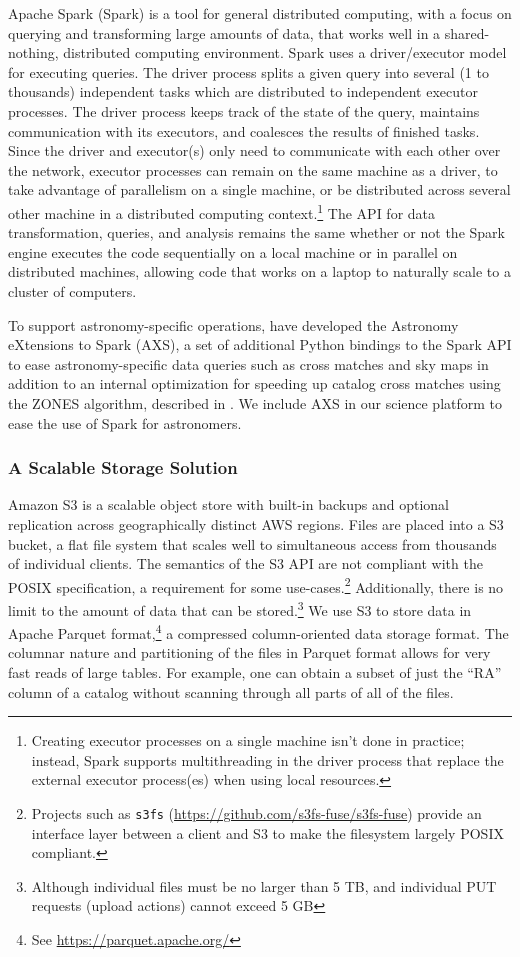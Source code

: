 \documentclass[twocolumn, linenumbers]{aastex631}
\begin{document}
Apache Spark (Spark) is a tool for general distributed computing, with a focus on querying and transforming large amounts of data, that works well in a shared-nothing, distributed computing environment. Spark uses a driver/executor model for executing queries. The driver process splits a given query into several (1 to thousands) independent tasks which are distributed to independent executor processes. The driver process keeps track of the state of the query, maintains communication with its executors, and coalesces the results of finished tasks. Since the driver and executor(s) only need to communicate with each other over the network, executor processes can remain on the same machine as a driver, to take advantage of parallelism on a single machine, or be distributed across several other machine in a distributed computing context.\footnote{Creating executor processes on a single machine isn't done in practice; instead, Spark supports multithreading in the driver process that replace the external executor process(es) when using local resources.} The API for data transformation, queries, and analysis remains the same whether or not the Spark engine executes the code sequentially on a local machine or in parallel on distributed machines, allowing code that works on a laptop to naturally scale to a cluster of computers.

To support astronomy-specific operations, \cite{zecevic} have developed the Astronomy eXtensions to Spark (AXS), a set of additional Python bindings to the Spark API to ease astronomy-specific data queries such as cross matches and sky maps in addition to an internal optimization for speeding up catalog cross matches using the ZONES algorithm, described in \cite{zecevic}. We include AXS in our science platform to ease the use of Spark for astronomers.

\subsubsection{A Scalable Storage Solution}
\label{sec:scalable_storage}

Amazon S3 is a scalable object store with built-in backups and optional replication across geographically distinct AWS regions. Files are placed into a S3 bucket, a flat file system that scales well to simultaneous access from thousands of individual clients. The semantics of the S3 API are not compliant with the POSIX specification, a requirement for some use-cases.\footnote{Projects such as \texttt{s3fs} (\url{https://github.com/s3fs-fuse/s3fs-fuse}) provide an interface layer between a client and S3 to make the filesystem largely POSIX compliant.} Additionally, there is no limit to the amount of data that can be stored.\footnote{Although individual files must be no larger than 5 TB, and individual PUT requests (upload actions) cannot exceed 5 GB} We use S3 to store data in Apache Parquet format,\footnote{See \url{https://parquet.apache.org/}} a compressed column-oriented data storage format. The columnar nature and partitioning of the files in Parquet format allows for very fast reads of large tables. For example, one can obtain a subset of just the ``RA'' column of a catalog without scanning through all parts of all of the files.
\end{document}
